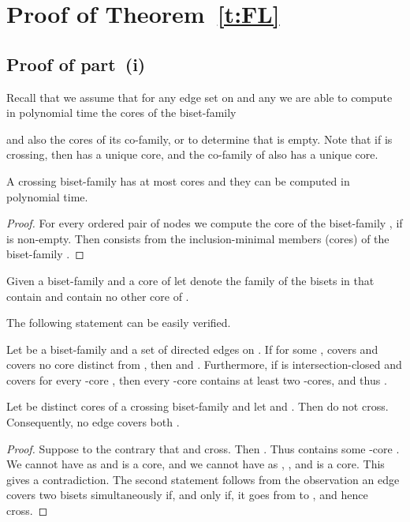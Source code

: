 \section{Proof of Theorem~\ref{t:FL}}

\subsection{Proof of part~(i)}

Recall that we assume that for any edge set  on  and any  we are able to compute 
in polynomial time the cores of the biset-family 
 
and also the cores of its co-family, or to determine that  is empty.
Note that if  is crossing, then  has a unique core, and the 
co-family of  also has a unique core.

 \begin{lemma} \label{l:poly}
A crossing biset-family  has at most  cores and they can be computed in polynomial time.
\end{lemma}
\begin{proof}
For every ordered pair of nodes  we compute the core  
of the biset-family , 
if  is non-empty.
Then  consists from the inclusion-minimal members (cores) 
of the biset-family . 
\end{proof}

\begin{definition}
Given a biset-family  and a core  of  
let  denote the family 
of the bisets in  that contain  and contain no other core of . 
\end{definition}

The following statement can be easily verified. 

\begin{claim} \label{c:iterative-merging}
Let  be a biset-family and  a set of directed edges on .
If for some ,
 covers  and covers no core distinct from , 
then  and 
.
Furthermore, if  is intersection-closed and  covers  
for every -core , 
then every -core contains at least two -cores, 
and thus .
\end{claim}

\begin{lemma} \label{l:HH}
Let  be distinct cores of a crossing biset-family  
and let  and  . 
Then  do not cross. Consequently, no edge covers both .
\end{lemma}
\begin{proof}
Suppose to the contrary that  and  cross.
Then .
Thus  contains some -core .
We cannot have  as  and  is a core, and
we cannot have       as , ,
and  is a core. This gives a contradiction. 
The second statement follows from the observation
an edge covers two bisets  simultaneously if, and only if, it goes from 
 to , and hence  cross.
\end{proof}

